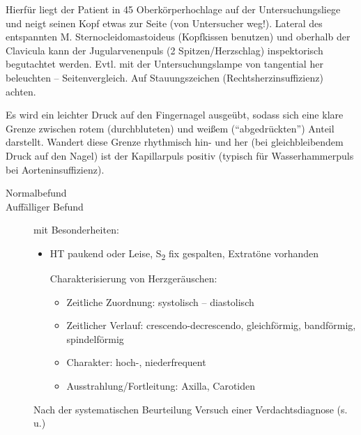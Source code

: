 {Hierfür liegt der Patient in 45{\textdegree}
Oberkörperhochlage auf der Untersuchungsliege und neigt seinen Kopf
etwas zur Seite (von Untersucher weg!). Lateral des entspannten
M. Sternocleidomastoideus
(Kopfkissen benutzen) und oberhalb der Clavicula kann der
Jugularvenenpuls (2 Spitzen/Herzschlag) inspektorisch begutachtet
werden. Evtl. mit der Untersuchungslampe von tangential her beleuchten
-- Seitenvergleich. Auf Stauungszeichen (Rechtsherzinsuffizienz)
achten.
}{\MoveDown}{}{}{}

{Es wird ein leichter Druck auf den Fingernagel ausgeübt,
sodass sich eine klare Grenze zwischen rotem
(durchbluteten) und weißem (\enquote{abgedrückten}) Anteil
darstellt. Wandert diese Grenze rhythmisch hin- und her
(bei gleichbleibendem Druck auf den Nagel) ist der
Kapillarpuls positiv (typisch für Wasserhammerpuls bei Aorteninsuffizienz).
}
{\MoveDown}
{}
{}
{}




{
\begin{description}
  \item[Normalbefund]
  \item[Auffälliger Befund] mit
  Besonderheiten:
  \begin{itemize}
    \item HT paukend oder Leise, S\textsubscript{2} fix
    gespalten, Extratöne vorhanden 
    
    Charakterisierung von Herzgeräuschen:
    \begin{itemize}
      \item Zeitliche Zuordnung: systolisch -- diastolisch
      \item Zeitlicher Verlauf: crescendo-decrescendo,
      gleichförmig, bandförmig, spindelförmig
      \item Charakter: hoch-, niederfrequent
      \item Ausstrahlung/Fortleitung: Axilla, Carotiden
    \end{itemize}
  \end{itemize}
  Nach der systematischen Beurteilung Versuch einer
  Verdachtsdiagnose (s.\,u.)
\end{description}
}
{
\begin{PkuBefunde}[]
  \item[\SymbolPkuNormal] 
  \item[\SymbolPkuVariante] 
  \item[\SymbolFindingPathological] 
\end{PkuBefunde}
}
{}
{}
{}


